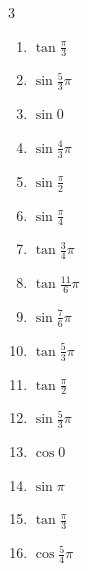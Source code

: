 \begin{multicols}{3}
\begin{enumerate}
  \item $\displaystyle \tan{\frac{\pi}{3}}$

  \item $\displaystyle \sin{\frac{5}{3}\pi}$

  \item $\displaystyle \sin{0}$
        \phantom{$\displaystyle =0$}

  \item $\displaystyle \sin{\frac{4}{3}\pi}$

  \item $\displaystyle \sin{\frac{\pi}{2}}$
        \phantom{$\displaystyle =1$}

  \item $\displaystyle \sin{\frac{\pi}{4}}$

  \item $\displaystyle \tan{\frac{3}{4}\pi}$
        \phantom{$\displaystyle =-1$}

  \item $\displaystyle \tan{\frac{11}{6}\pi}$

  \item $\displaystyle \sin{\frac{7}{6}\pi}$

  \item $\displaystyle \tan{\frac{5}{3}\pi}$

  \item $\displaystyle \tan{\frac{\pi}{2}}$
        \phantom{$\displaystyle \quad なし$}

  \item $\displaystyle \sin{\frac{5}{3}\pi}$

  \item $\displaystyle \cos{0}$
        \phantom{$\displaystyle =1$}

  \item $\displaystyle \sin{\pi}$
        \phantom{$\displaystyle =0$}

  \item $\displaystyle \tan{\frac{\pi}{3}}$

  \item $\displaystyle \cos{\frac{5}{4}\pi}$


\end{enumerate}
\end{multicols}
